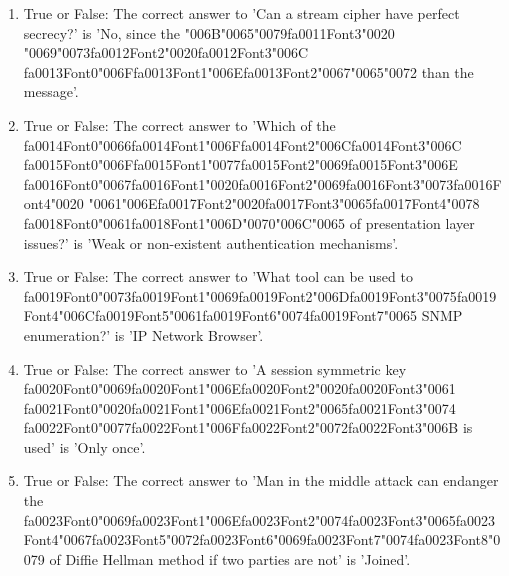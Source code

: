 \documentclass[12pt]{article}
\begin{document}
\begin{enumerate}[label=\arabic*.]
\item True or False: The correct answer to 'Can a stream cipher have perfect secrecy?' is 'No, since the {\char"006B}{\char"0065}{\char"0079}{\csname fa0011Font3\endcsname\char"0020} {\char"0069}{\char"0073}{\csname fa0012Font2\endcsname\char"0020}{\csname fa0012Font3\endcsname\char"006C} {\csname fa0013Font0\endcsname\char"006F}{\csname fa0013Font1\endcsname\char"006E}{\csname fa0013Font2\endcsname\char"0067}{\char"0065}{\char"0072} than the message'.
\item True or False: The correct answer to 'Which of the {\csname fa0014Font0\endcsname\char"0066}{\csname fa0014Font1\endcsname\char"006F}{\csname fa0014Font2\endcsname\char"006C}{\csname fa0014Font3\endcsname\char"006C} {\csname fa0015Font0\endcsname\char"006F}{\csname fa0015Font1\endcsname\char"0077}{\csname fa0015Font2\endcsname\char"0069}{\csname fa0015Font3\endcsname\char"006E} {\csname fa0016Font0\endcsname\char"0067}{\csname fa0016Font1\endcsname\char"0020}{\csname fa0016Font2\endcsname\char"0069}{\csname fa0016Font3\endcsname\char"0073}{\csname fa0016Font4\endcsname\char"0020} {\char"0061}{\char"006E}{\csname fa0017Font2\endcsname\char"0020}{\csname fa0017Font3\endcsname\char"0065}{\csname fa0017Font4\endcsname\char"0078} {\csname fa0018Font0\endcsname\char"0061}{\csname fa0018Font1\endcsname\char"006D}{\char"0070}{\char"006C}{\char"0065} of presentation layer issues?' is 'Weak or non-existent authentication mechanisms'.
\item True or False: The correct answer to 'What tool can be used to {\csname fa0019Font0\endcsname\char"0073}{\csname fa0019Font1\endcsname\char"0069}{\csname fa0019Font2\endcsname\char"006D}{\csname fa0019Font3\endcsname\char"0075}{\csname fa0019Font4\endcsname\char"006C}{\csname fa0019Font5\endcsname\char"0061}{\csname fa0019Font6\endcsname\char"0074}{\csname fa0019Font7\endcsname\char"0065} SNMP enumeration?' is 'IP Network Browser'.
\item True or False: The correct answer to 'A session symmetric key {\csname fa0020Font0\endcsname\char"0069}{\csname fa0020Font1\endcsname\char"006E}{\csname fa0020Font2\endcsname\char"0020}{\csname fa0020Font3\endcsname\char"0061} {\csname fa0021Font0\endcsname\char"0020}{\csname fa0021Font1\endcsname\char"006E}{\csname fa0021Font2\endcsname\char"0065}{\csname fa0021Font3\endcsname\char"0074} {\csname fa0022Font0\endcsname\char"0077}{\csname fa0022Font1\endcsname\char"006F}{\csname fa0022Font2\endcsname\char"0072}{\csname fa0022Font3\endcsname\char"006B} is used' is 'Only once'.
\item True or False: The correct answer to 'Man in the middle attack can endanger the {\csname fa0023Font0\endcsname\char"0069}{\csname fa0023Font1\endcsname\char"006E}{\csname fa0023Font2\endcsname\char"0074}{\csname fa0023Font3\endcsname\char"0065}{\csname fa0023Font4\endcsname\char"0067}{\csname fa0023Font5\endcsname\char"0072}{\csname fa0023Font6\endcsname\char"0069}{\csname fa0023Font7\endcsname\char"0074}{\csname fa0023Font8\endcsname\char"0079} of Diffie Hellman method if two parties are not' is 'Joined'.

\end{enumerate}
\end{document}
